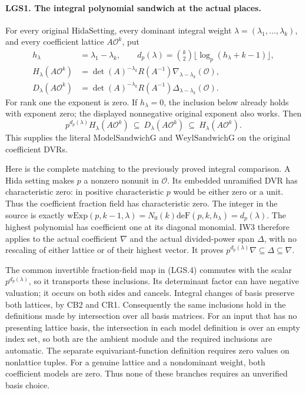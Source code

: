 \documentclass[11pt,a4paper]{article}
\numberwithin{equation}{section}
\theoremstyle{remark}\newtheorem{remark}[theorem]{Remark}
\begin{document}
\paragraph{LGS1. The integral polynomial sandwich at the actual places.}
\label{claim:LGS1}
For every original \(\mathrm{HidaSetting}\), every dominant integral
weight \(\lambda=(\lambda_1,\ldots,\lambda_k)\), and every coefficient
lattice \(A\mathcal O^k\), put
\[
 \begin{split}
 h_\lambda&=\lambda_1-\lambda_k,\qquad
 d_p(\lambda)=\binom{k}{2}\lfloor\log_p(h_\lambda+k-1)\rfloor,\\
 H_\lambda(A\mathcal O^k)
   &=\det(A)^{-\lambda_k}R(A^{-1})
                 \nabla_{\lambda-\lambda_k}(\mathcal O),\\
 D_\lambda(A\mathcal O^k)
   &=\det(A)^{-\lambda_k}R(A^{-1})
                 \Delta_{\lambda-\lambda_k}(\mathcal O).
 \end{split}                                                     \tag{LGS.4}
\]
For rank one the exponent is zero.  If \(h_\lambda=0\), the
inclusion below already holds with exponent zero; the displayed
nonnegative original exponent also works.  Then
\[
       p^{d_p(\lambda)}H_\lambda(A\mathcal O^k)
       \ \subseteq\ D_\lambda(A\mathcal O^k)
       \ \subseteq\ H_\lambda(A\mathcal O^k).            \tag{LGS.5}
\]
This supplies the literal \(\mathrm{ModelSandwichG}\) and
\(\mathrm{WeylSandwichG}\) on the original coefficient DVRs.

Here is the complete matching to the previously proved integral
comparison.  A Hida setting makes \(p\) a nonzero nonunit in
\(\mathcal O\).  Its embedded unramified DVR has characteristic zero:
in positive characteristic \(p\) would be either zero or a unit.
Thus the coefficient fraction field has characteristic zero.
The integer in the source is exactly
\(\mathrm{wExp}(p,k-1,\lambda)
 =N_0(k)\mathrm{deF}(p,k,h_\lambda)=d_p(\lambda)\).
The highest polynomial has coefficient one at its diagonal
monomial.  IW3 therefore applies to the actual coefficient
\(\nabla\) and the actual divided-power span \(\Delta\), with no
rescaling of either lattice or of their highest vector.
It proves \(p^{d_p(\lambda)}\nabla\subseteq\Delta\subseteq\nabla\).

The common invertible fraction-field map in (LGS.4) commutes with
the scalar \(p^{d_p(\lambda)}\), so it transports these inclusions.
Its determinant factor can have negative valuation; it occurs on
both sides and cancels.  Integral changes of basis preserve both
lattices, by CB2 and CR1.  Consequently the same inclusions hold
in the definitions made by intersection over all basis matrices.
For an input that has no presenting lattice basis, the
intersection in each model definition is over an empty
index set, so both are the ambient module and the required
inclusions are automatic.  The separate equivariant-function
definition requires zero values on nonlattice tuples.
For a genuine lattice and a nondominant weight, both
coefficient models are zero.  Thus none of these branches
requires an unverified basis choice.
\end{document}

